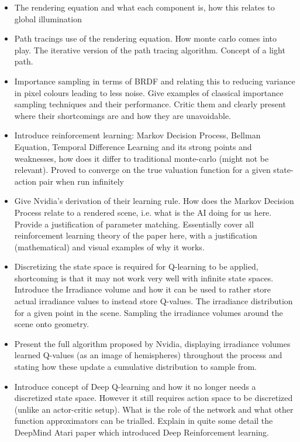 \documentclass[ %
                    author={Callum Pearce},
                supervisor={Dr. Neill Campbell},
                    degree={MEng},
                     title={How effective are Temporal difference learning methods in reducing the number of zero contribution light paths in Path tracing?},
                  subtitle={},
                      type={research},
                      year={2019} ]{dissertation}
\begin{document}
\begin{itemize}
\item The rendering equation and what each component is, how this relates to global illumination

\item Path tracings use of the rendering equation. How monte carlo comes into play. The iterative version of the path tracing algorithm. Concept of a light path.

\item Importance sampling in terms of BRDF and relating this to reducing variance in pixel colours leading to less noise. Give examples of classical importance sampling techniques and their performance. Critic them and clearly present where their shortcomings are and how they are unavoidable.

\item Introduce reinforcement learning: Markov Decision Process, Bellman 
Equation, Temporal Difference Learning and its strong points and weaknesses,
 how does it differ to traditional monte-carlo (might not be relevant). Proved 
 to converge on the true valuation function for a given state-action pair when 
 run infinitely
 
 \item Give Nvidia's derivation of their learning rule. How does the Markov Decision Process relate to a rendered scene, i.e. what is the AI doing for us here. Provide a justification of parameter matching. Essentially cover all reinforcement learning theory of the paper here, with a justification (mathematical) and visual examples of why it works. 
 
 \item Discretizing the state space is required for Q-learning to be applied, shortcoming is that it may not work very well with infinite state spaces. Introduce the Irradiance volume and how it can be used to rather store actual irradiance values to instead store Q-values. The irradiance distribution for a given point in the scene. Sampling the irradiance volumes around the scene onto geometry. 
 
 \item Present the full algorithm proposed by Nvidia, displaying irradiance volumes learned Q-values (as an image of hemispheres) throughout the process and stating how these update a cumulative distribution to sample from.
 
 \item Introduce concept of Deep Q-learning and how it no longer needs a discretized state space. However it still requires action space to be discretized (unlike an actor-critic setup). What is the role of the network and what other function approximators can be trialled. Explain in quite some detail the DeepMind Atari paper which introduced Deep Reinforcement learning.
 
\end{itemize}
\end{document}
